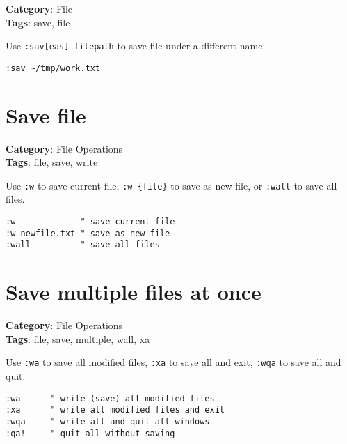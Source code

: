 {{{{{\textbf{Category}: File\\ \textbf{Tags}: save, file
\vspace{0.5cm}

Use {\footnotesize \Verb§:sav[eas] filepath§} to save file under a different name

\begin{Exa*}{}
\begin{Verbatim}[fontsize=\footnotesize, breaklines, breakanywhere]
:sav ~/tmp/work.txt
\end{Verbatim}
\end{Exa*}

\section{Save file}

\textbf{Category}: File Operations\\ \textbf{Tags}: file, save, write
\vspace{0.5cm}

Use {\footnotesize \Verb§:w§} to save current file, {\footnotesize \Verb§:w {file}§} to save as new file, or {\footnotesize \Verb§:wall§} to save all files.

\begin{Exa*}{}
\begin{Verbatim}[fontsize=\footnotesize, breaklines, breakanywhere]
:w             " save current file
:w newfile.txt " save as new file
:wall          " save all files
\end{Verbatim}
\end{Exa*}

\section{Save multiple files at once}

\textbf{Category}: File Operations\\ \textbf{Tags}: file, save, multiple, wall, xa
\vspace{0.5cm}

Use {\footnotesize \Verb§:wa§} to save all modified files, {\footnotesize \Verb§:xa§} to save all and exit, {\footnotesize \Verb§:wqa§} to save all and quit.

\begin{Exa*}{}
\begin{Verbatim}[fontsize=\footnotesize, breaklines, breakanywhere]
:wa      " write (save) all modified files
:xa      " write all modified files and exit
:wqa     " write all and quit all windows
:qa!     " quit all without saving
\end{Verbatim}
\end{Exa*}

}}}}}
